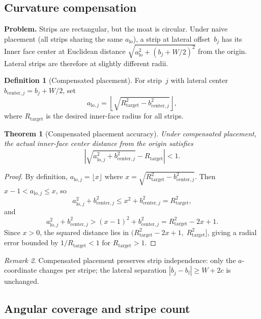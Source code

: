 \documentclass[11pt,a4paper]{article}
\theoremstyle{definition}
\newtheorem{definition}{Definition}[section]
\theoremstyle{plain}
\newtheorem{theorem}{Theorem}[section]
\theoremstyle{remark}
\newtheorem{remark}[theorem]{Remark}
\begin{document}
\subsection{Curvature compensation}

\noindent\textbf{Problem.}  Strips are rectangular, but the moat is circular.  Under naive placement (all strips sharing the same $a_{\text{lo}}$), a strip at lateral offset~$b_j$ has its Inner face center at Euclidean distance $\sqrt{a_{\text{lo}}^2 + (b_j + W/2)^2}$ from the origin.  Lateral strips are therefore at slightly different radii.

\begin{definition}[Compensated placement]\label{def:compensated}
For strip~$j$ with lateral center $b_{\text{center},j} = b_j + W/2$, set
\[
  a_{\text{lo},j} = \left\lfloor \sqrt{R_{\text{target}}^2 - b_{\text{center},j}^2} \right\rfloor,
\]
where $R_{\text{target}}$ is the desired inner-face radius for all strips.
\end{definition}

\begin{theorem}[Compensated placement accuracy]\label{thm:compensated}
Under compensated placement, the actual inner-face center distance from the origin satisfies
\[
  \left|\sqrt{a_{\text{lo},j}^2 + b_{\text{center},j}^2} - R_{\text{target}}\right| < 1.
\]
\end{theorem}

\begin{proof}
By definition, $a_{\text{lo},j} = \lfloor x \rfloor$ where $x = \sqrt{R_{\text{target}}^2 - b_{\text{center},j}^2}$.  Then $x - 1 < a_{\text{lo},j} \le x$, so
\[
  a_{\text{lo},j}^2 + b_{\text{center},j}^2 \le x^2 + b_{\text{center},j}^2 = R_{\text{target}}^2,
\]
and
\[
  a_{\text{lo},j}^2 + b_{\text{center},j}^2 > (x-1)^2 + b_{\text{center},j}^2 = R_{\text{target}}^2 - 2x + 1.
\]
Since $x > 0$, the squared distance lies in $(R_{\text{target}}^2 - 2x + 1,\; R_{\text{target}}^2]$, giving a radial error bounded by $1/R_{\text{target}} < 1$ for $R_{\text{target}} > 1$.
\end{proof}

\begin{remark}\label{rem:compensated-independence}
Compensated placement preserves strip independence: only the $a$-coordinate changes per stripe; the lateral separation $|b_j - b_l| \ge W + 2c$ is unchanged.
\end{remark}

\subsection{Angular coverage and stripe count}
\end{document}
